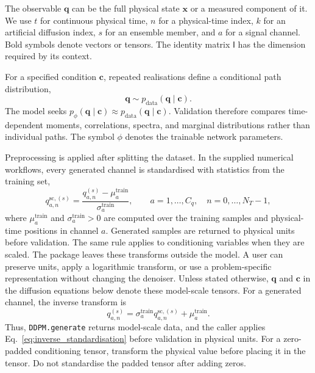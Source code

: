 The observable $\mathbf{q}$ can be the full physical state $\mathbf{x}$ or a
measured component of it. We use $t$ for continuous physical time, $n$ for a
physical-time index, $k$ for an artificial diffusion index, $s$ for an ensemble
member, and $a$ for a signal channel. Bold symbols denote vectors or tensors. The
identity matrix $\mathsf{I}$ has the dimension required by its context.

For a specified condition $\mathbf{c}$, repeated realisations define a
conditional path distribution,
\begin{equation}
    \mathbf{q}\sim p_{\mathrm{data}}(\mathbf{q}\mid\mathbf{c}).
    \label{eq:physical_trajectory_distribution}
\end{equation}
The model seeks
$p_\phi(\mathbf{q}\mid\mathbf{c})\approx
p_{\mathrm{data}}(\mathbf{q}\mid\mathbf{c})$. Validation therefore compares
time-dependent moments, correlations, spectra, and marginal distributions rather
than individual paths. The symbol $\phi$ denotes the trainable network parameters.

Preprocessing is applied after splitting the dataset. In the supplied numerical
workflows, every generated channel is standardised with statistics from the
training set,
\begin{equation}
    q_{a,n}^{\mathrm{sc},(s)}
    =
    \frac{q_{a,n}^{(s)}-\mu_a^{\mathrm{train}}}
         {\sigma_a^{\mathrm{train}}},
    \qquad
    a=1,\ldots,C_q,\quad n=0,\ldots,N_T-1,
    \label{eq:standardisation}
\end{equation}
where $\mu_a^{\mathrm{train}}$ and $\sigma_a^{\mathrm{train}}>0$ are computed over
the training samples and physical-time positions in channel $a$. Generated samples
are returned to physical units before validation. The same rule applies to
conditioning variables when they are scaled. The package leaves these transforms
outside the model. A user can preserve units, apply a logarithmic transform, or use
a problem-specific representation without changing the denoiser. Unless stated
otherwise, $\mathbf{q}$ and $\mathbf{c}$ in the diffusion equations below denote
these model-scale tensors. For a generated channel, the inverse transform is
\begin{equation}
    q_{a,n}^{(s)}
    =
    \sigma_a^{\mathrm{train}}q_{a,n}^{\mathrm{sc},(s)}
    +
    \mu_a^{\mathrm{train}}.
    \label{eq:inverse_standardisation}
\end{equation}
Thus, \texttt{DDPM.generate} returns model-scale data, and the caller applies
Eq.~\eqref{eq:inverse_standardisation} before validation in physical units. For a
zero-padded conditioning tensor, transform the physical value before placing it in
the tensor. Do not standardise the padded tensor after adding zeros.

